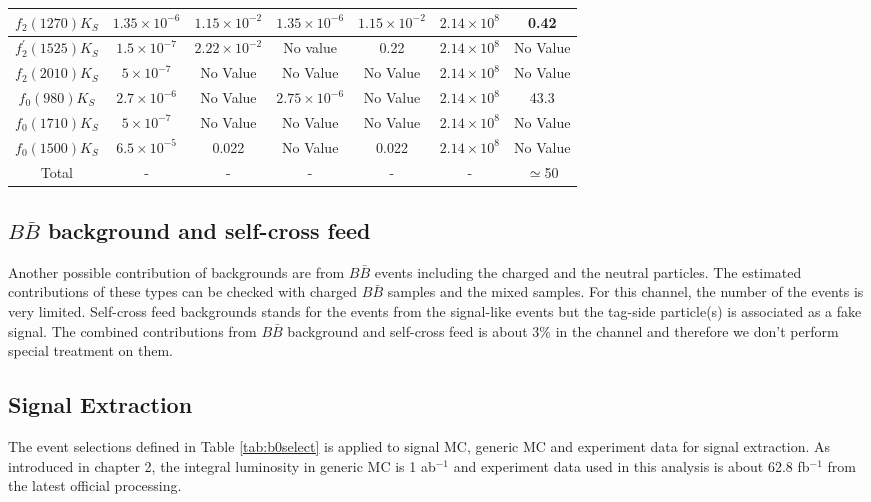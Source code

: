 \begin{table}
\begin{tabular}{|c|c|c|c|c|c|c|}
		\hline
		$f_2(1270)K_S$ & $1.35\times 10^{-6}$ & $1.15\times 10^{-2}$ & $1.35\times 10^{-6}$ & $1.15\times 10^{-2}$ & $2.14\times 10^8$ & 0.42 \\
		\hline
		$f_{2}^{'}(1525)K_S$ & $1.5\times 10^{-7} $ & $2.22\times 10^{-2}$ & No value & 0.22 & $2.14\times 10^8$ & No Value \\
		\hline
		$f_2(2010)K_S$ & $5\times 10^{-7}$ & No Value  & No Value  & No Value  & $2.14\times 10^8$ & No Value \\
		\hline
		$f_0(980)K_S$ & $2.7\times 10^{-6}$ & No Value & $2.75\times 10^{-6}$ & No Value & $2.14\times 10^8$ & 43.3 \\
		\hline
		$f_0(1710)K_S$ & $5\times 10^{-7}$ & No Value  & No Value  & No Value  & $2.14\times 10^8$ & No Value \\
		\hline
		$f_0(1500)K_S$ & $6.5\times 10^{-5}$ & 0.022 & No Value & 0.022 & $2.14\times 10^8$ & No Value \\
		\hline
		Total  & - & - & - & - & - & $\simeq$50 \\
		\hline
	\end{tabular}
\end{table}


\subsection{$B\bar{B}$ background and self-cross feed}
Another possible contribution of backgrounds are from $B\bar{B}$ events including the charged and the neutral particles. The estimated contributions of these types can be checked with charged $B\bar{B}$ samples and the mixed samples. For this channel, the number of the events is very limited. Self-cross feed backgrounds stands for the events from the signal-like events but the tag-side particle(s) is associated as a fake signal. The combined contributions from $B\bar{B}$ background and self-cross feed is about 3\% in the channel and therefore we don't perform special treatment on them.

\subsection{Signal Extraction}
The event selections defined in Table \ref{tab:b0select} is applied to signal MC, generic MC and experiment data for signal extraction. As introduced in chapter 2, the integral luminosity in generic MC is 1 ab$^{-1}$ and experiment data used in this analysis is about 62.8 fb$^{-1}$ from the latest official processing. 

